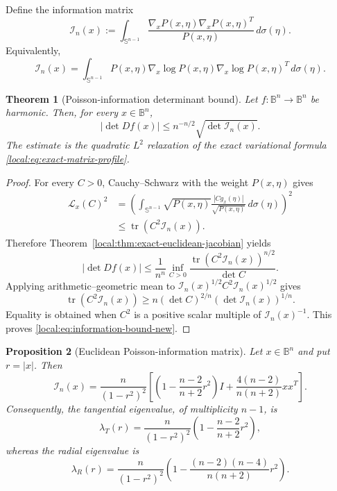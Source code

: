 \documentclass[11pt,reqno]{amsart}
\newtheorem{theorem}{Theorem}[section]
\newtheorem{proposition}[theorem]{Proposition}
\theoremstyle{remark}
\newcommand{\B}{\mathbb B}
\newcommand{\Sph}{\mathbb S}
\newcommand{\tr}{\operatorname{tr}}
\begin{document}
Define the information matrix
\begin{equation}\label{local:eq:information-matrix-new}
 \mathcal I_n(x)
 :=
 \int_{\Sph^{n-1}}
 \frac{
 \nabla_xP(x,\eta)\nabla_xP(x,\eta)^T
 }{
 P(x,\eta)
 }
 \,d\sigma(\eta).
\end{equation}
Equivalently,
\[
 \mathcal I_n(x)
 =
 \int_{\Sph^{n-1}}
 P(x,\eta)
 \nabla_x\log P(x,\eta)
 \nabla_x\log P(x,\eta)^T
 \,d\sigma(\eta).
\]

\begin{theorem}[Poisson-information determinant bound]
\label{local:thm:euclidean-poisson-information}
Let $f:\B^n\to\B^n$ be harmonic.  Then, for every $x\in\B^n$,
\begin{equation}\label{local:eq:information-bound-new}
 |\det Df(x)|
 \le
 n^{-n/2}\sqrt{\det\mathcal I_n(x)}.
\end{equation}
The estimate is the quadratic $L^2$ relaxation of the exact variational
formula \eqref{local:eq:exact-matrix-profile}.
\end{theorem}

\begin{proof}
For every $C>0$, Cauchy--Schwarz with the weight $P(x,\eta)$ gives
\begin{align*}
 \mathcal L_x(C)^2
 &=
 \left(
 \int_{\Sph^{n-1}}
 \sqrt{P(x,\eta)}
 \frac{|Cg_x(\eta)|}{\sqrt{P(x,\eta)}}
 \,d\sigma(\eta)
 \right)^2\\
 &\le
 \tr\!\left(C^2\mathcal I_n(x)\right).
\end{align*}
Therefore Theorem~\ref{local:thm:exact-euclidean-jacobian} yields
\[
 |\det Df(x)|
 \le
 \frac1{n^n}
 \inf_{C>0}
 \frac{\tr(C^2\mathcal I_n(x))^{n/2}}{\det C}.
\]
Applying arithmetic--geometric mean to
$\mathcal I_n(x)^{1/2}C^2\mathcal I_n(x)^{1/2}$ gives
\[
 \tr(C^2\mathcal I_n(x))
 \ge
 n(\det C)^{2/n}(\det\mathcal I_n(x))^{1/n}.
\]
Equality is obtained when $C^2$ is a positive scalar multiple of
$\mathcal I_n(x)^{-1}$.  This proves \eqref{local:eq:information-bound-new}.
\end{proof}

\begin{proposition}[Euclidean Poisson-information matrix]
\label{local:prop:euclidean-poisson-information}
Let $x\in\B^n$ and put $r=|x|$.  Then
\begin{equation}\label{local:eq:I-explicit-new}
 \mathcal I_n(x)
 =
 \frac{n}{(1-r^2)^2}
 \left[
 \left(1-\frac{n-2}{n+2}r^2\right)I
 +
 \frac{4(n-2)}{n(n+2)}xx^T
 \right].
\end{equation}
Consequently, the tangential eigenvalue, of multiplicity $n-1$, is
\begin{equation}\label{local:eq:lambda-T-new}
 \lambda_T(r)
 =
 \frac{n}{(1-r^2)^2}
 \left(1-\frac{n-2}{n+2}r^2\right),
\end{equation}
whereas the radial eigenvalue is
\begin{equation}\label{local:eq:lambda-R-new}
 \lambda_R(r)
 =
 \frac{n}{(1-r^2)^2}
 \left(
 1-\frac{(n-2)(n-4)}{n(n+2)}r^2
 \right).
\end{equation}
\end{proposition}
\end{document}
